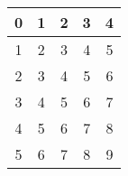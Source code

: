 \documentclass[a4paper,11pt]{article}
\begin{document}
\begin{tabular}{| c | c | c | c | c |}
 \hline
0 & 1 & 2 & 3 & 4 \\
 \hline
1 & 2 & 3 & 4 & 5 \\
 \hline
2 & 3 & 4 & 5 & 6 \\
 \hline
3 & 4 & 5 & 6 & 7 \\
 \hline
4 & 5 & 6 & 7 & 8 \\
 \hline
5 & 6 & 7 & 8 & 9 \\
 \hline
\end{tabular}
\end{document}
